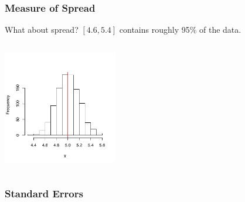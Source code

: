 \documentclass[handout]{beamer}
\newcommand{\blue}[1]{\textcolor{blue2}{#1}}
\begin{document}
\begin{frame}[fragile]
\frametitle{Measure of Spread}
What about spread?  $[4.6, 5.4]$ contains roughly 95\% of the data.

\begin{columns}[c]
\includegraphics[width=5cm]{figure/lec12-001}
\end{columns}




\end{frame}


\begin{frame}[fragile]
\frametitle{Standard Errors}

%
%
%
%
%
%

\end{frame}
\end{document}
